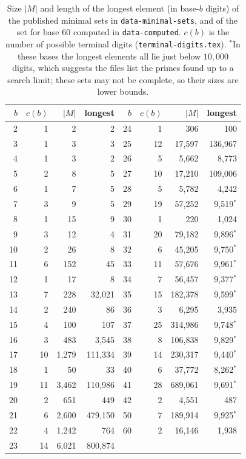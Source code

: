 \documentclass[11pt]{article}
\theoremstyle{remark}
\newcommand{\code}[1]{\texttt{#1}}
\begin{document}
\begin{table}[h]
\centering\small
\setlength{\tabcolsep}{5pt}
\begin{tabular}{@{}rrrr@{\qquad}rrrr@{}}
\toprule
$b$ & $c(b)$ & $|M|$ & longest & $b$ & $c(b)$ & $|M|$ & longest\\
\midrule
2 & 1 & 2 & 2 & 24 & 1 & 306 & 100 \\
3 & 1 & 3 & 3 & 25 & 12 & 17{,}597 & 136{,}967 \\
4 & 1 & 3 & 2 & 26 & 5 & 5{,}662 & 8{,}773 \\
5 & 2 & 8 & 5 & 27 & 10 & 17{,}210 & 109{,}006 \\
6 & 1 & 7 & 5 & 28 & 5 & 5{,}782 & 4{,}242 \\
7 & 3 & 9 & 5 & 29 & 19 & 57{,}252 & 9{,}519$^{*}$ \\
8 & 1 & 15 & 9 & 30 & 1 & 220 & 1{,}024 \\
9 & 3 & 12 & 4 & 31 & 20 & 79{,}182 & 9{,}896$^{*}$ \\
10 & 2 & 26 & 8 & 32 & 6 & 45{,}205 & 9{,}750$^{*}$ \\
11 & 6 & 152 & 45 & 33 & 11 & 57{,}676 & 9{,}961$^{*}$ \\
12 & 1 & 17 & 8 & 34 & 7 & 56{,}457 & 9{,}377$^{*}$ \\
13 & 7 & 228 & 32{,}021 & 35 & 15 & 182{,}378 & 9{,}599$^{*}$ \\
14 & 2 & 240 & 86 & 36 & 3 & 6{,}295 & 3{,}935 \\
15 & 4 & 100 & 107 & 37 & 25 & 314{,}986 & 9{,}748$^{*}$ \\
16 & 3 & 483 & 3{,}545 & 38 & 8 & 106{,}838 & 9{,}829$^{*}$ \\
17 & 10 & 1{,}279 & 111{,}334 & 39 & 14 & 230{,}317 & 9{,}440$^{*}$ \\
18 & 1 & 50 & 33 & 40 & 6 & 37{,}772 & 8{,}262$^{*}$ \\
19 & 11 & 3{,}462 & 110{,}986 & 41 & 28 & 689{,}061 & 9{,}691$^{*}$ \\
20 & 2 & 651 & 449 & 42 & 2 & 4{,}551 & 487 \\
21 & 6 & 2{,}600 & 479{,}150 & 50 & 7 & 189{,}914 & 9{,}925$^{*}$ \\
22 & 4 & 1{,}242 & 764 & 60 & 2 & 16{,}146 & 1{,}938 \\
23 & 14 & 6{,}021 & 800{,}874 & & & & \\
\bottomrule
\end{tabular}
\caption{Size $|M|$ and length of the longest element (in base-$b$ digits) of the published minimal sets in \code{data-minimal-sets}, and of the set for base 60 computed in \code{data-computed}. $c(b)$ is the number of possible terminal digits (\code{terminal-digits.tex}). $^{*}$In these bases the longest elements all lie just below $10{,}000$ digits, which suggests the files list the primes found up to a search limit; these sets may not be complete, so their sizes are lower bounds.}
\label{tab:sizes}
\end{table}
\end{document}
